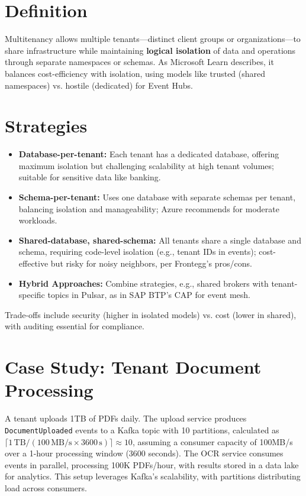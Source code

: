 \documentclass[12pt,a4paper]{report}
\begin{document}
\section{Definition}
Multitenancy allows multiple tenants—distinct client groups or organizations—to share infrastructure while maintaining \textbf{logical isolation} of data and operations through separate namespaces or schemas. As Microsoft Learn describes, it balances cost-efficiency with isolation, using models like trusted (shared namespaces) vs. hostile (dedicated) for Event Hubs.

\section{Strategies}
\begin{itemize}
    \item \textbf{Database-per-tenant:} Each tenant has a dedicated database, offering maximum isolation but challenging scalability at high tenant volumes; suitable for sensitive data like banking.
    \item \textbf{Schema-per-tenant:} Uses one database with separate schemas per tenant, balancing isolation and manageability; Azure recommends for moderate workloads.
    \item \textbf{Shared-database, shared-schema:} All tenants share a single database and schema, requiring code-level isolation (e.g., tenant IDs in events); cost-effective but risky for noisy neighbors, per Frontegg's pros/cons.
    \item \textbf{Hybrid Approaches:} Combine strategies, e.g., shared brokers with tenant-specific topics in Pulsar, as in SAP BTP's CAP for event mesh.
\end{itemize}

Trade-offs include security (higher in isolated models) vs. cost (lower in shared), with auditing essential for compliance.

\section{Case Study: Tenant Document Processing}
A tenant uploads 1TB of PDFs daily. The upload service produces \texttt{DocumentUploaded} events to a Kafka topic with 10 partitions, calculated as \(\lceil 1 \, \text{TB} / (100 \, \text{MB/s} \times 3600 \, \text{s}) \rceil \approx 10\), assuming a consumer capacity of 100MB/s over a 1-hour processing window (3600 seconds). The OCR service consumes events in parallel, processing 100K PDFs/hour, with results stored in a data lake for analytics. This setup leverages Kafka's scalability, with partitions distributing load across consumers.\autocite{kafka2025}
\end{document}

